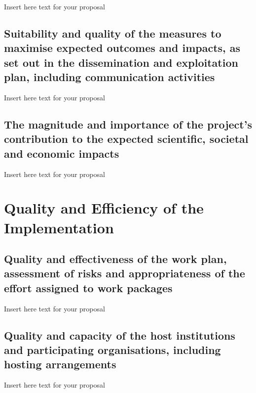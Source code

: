 \documentclass[11pt]{article}
\begin{document}
Insert here text for your proposal

\subsection{Suitability and quality of the measures to maximise expected outcomes and impacts, as set out in the dissemination and exploitation plan, including communication activities}

Insert here text for your proposal

\subsection{The magnitude and importance of the project’s contribution to the expected scientific, societal and economic impacts}

Insert here text for your proposal

\section{Quality and Efficiency of the Implementation}

\subsection{Quality and effectiveness of the work plan, assessment of risks and appropriateness of the effort assigned to work packages}

Insert here text for your proposal

\subsection{Quality and capacity of the host institutions and participating organisations, including hosting arrangements}

Insert here text for your proposal
\end{document}
